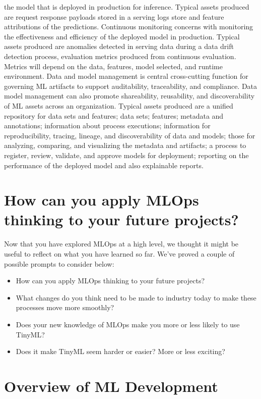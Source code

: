 the model that is deployed in production for inference.
Typical assets produced are request response payloads
stored in a serving logs store and feature
attributions of the predictions.
Continuous monitoring concerns with monitoring
the effectiveness and efficiency of the deployed model in production.
Typical assets produced are anomalies detected in serving data during a data
drift detection process, evaluation metrics
produced from continuous evaluation.
Metrics will depend on the data, features, model selected,
and runtime environment.
Data and model management is central cross-cutting function
for governing ML artifacts to support auditability, traceability,
and compliance.
Data model management can also promote shareability, reusability,
and discoverability of ML assets across an organization.
Typical assets produced are a unified repository for data sets and features;
data sets; features; metadata and annotations; information
about process executions; information for reproducibility, tracing, lineage,
and discoverability of data and models; those for analyzing, comparing,
and visualizing the metadata and artifacts; a process
to register, review, validate, and approve models for deployment;
reporting on the performance of the deployed model
and also explainable reports.

\section{How can you apply MLOps thinking to your future projects?}

Now that you have explored MLOps at a high level, we thought it might be useful to reflect on what you have learned so far. We’ve proved a couple of possible prompts to consider below:

\begin{itemize}
    \item How can you apply MLOps thinking to your future projects?
    \item What changes do you think need to be made to industry today to make these processes move more smoothly?
    \item Does your new knowledge of MLOps make you more or less likely to use TinyML?
    \item Does it make TinyML seem harder or easier? More or less exciting?
\end{itemize}


\section{Overview of ML Development}

